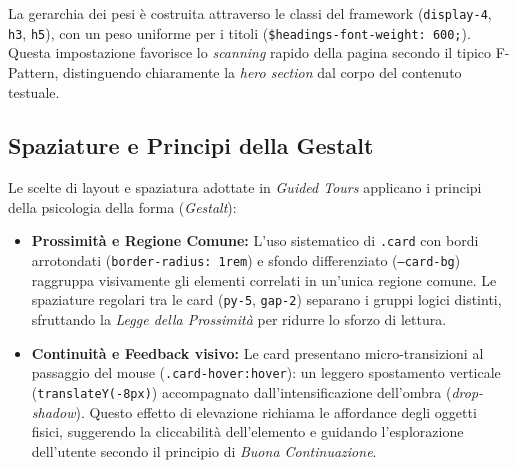 La gerarchia dei pesi è costruita attraverso le classi del framework (\texttt{display-4}, \texttt{h3}, \texttt{h5}), con un peso uniforme per i titoli (\texttt{\$headings-font-weight: 600;}). Questa impostazione favorisce lo \textit{scanning} rapido della pagina secondo il tipico F-Pattern, distinguendo chiaramente la \textit{hero section} dal corpo del contenuto testuale.

\subsection{Spaziature e Principi della Gestalt}
Le scelte di layout e spaziatura adottate in \textit{Guided Tours} applicano i principi della psicologia della forma (\textit{Gestalt}):
\begin{itemize}
    \item \textbf{Prossimità e Regione Comune:} L'uso sistematico di \texttt{.card} con bordi arrotondati (\texttt{border-radius: 1rem}) e sfondo differenziato (\texttt{--card-bg}) raggruppa visivamente gli elementi correlati in un'unica regione comune. Le spaziature regolari tra le card (\texttt{py-5}, \texttt{gap-2}) separano i gruppi logici distinti, sfruttando la \textit{Legge della Prossimità} per ridurre lo sforzo di lettura.
    \item \textbf{Continuità e Feedback visivo:} Le card presentano micro-transizioni al passaggio del mouse (\texttt{.card-hover:hover}): un leggero spostamento verticale (\texttt{translateY(-8px)}) accompagnato dall'intensificazione dell'ombra (\textit{drop-shadow}). Questo effetto di elevazione richiama le affordance degli oggetti fisici, suggerendo la cliccabilità dell'elemento e guidando l'esplorazione dell'utente secondo il principio di \textit{Buona Continuazione}.
\end{itemize}


